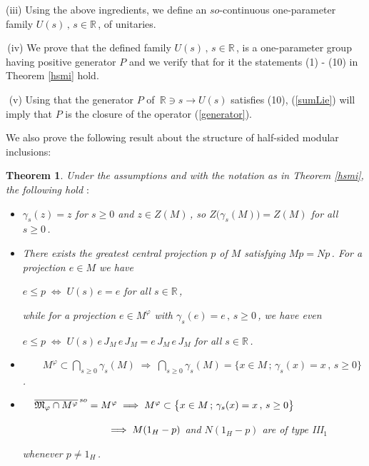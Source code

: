 \documentclass[reqno]{amsart}
\newtheorem{theorem}{Theorem}[section]
\theoremstyle{definition}
\theoremstyle{remark}
\numberwithin{equation}{section}
\theoremstyle{plain}
\begin{document}
(iii) Using the above ingredients, we define an $so$-continuous
one-parameter family $U(s)\, ,\, s\in \mathbb R\,$, of unitaries.

$\,$(iv) We prove that the defined family $U(s)\, ,\, s\in
\mathbb R\,$, is a one-parameter group having positive generator $P$
and we verify that for it the statements (1) - (10) in Theorem
\ref{hsmi} hold.

$\,\,$(v) Using that the generator $P$ of $\,\mathbb R\ni s
\to U(s)$ satisfies (10), (\ref{sumLie}) will imply that $P$ is
the closure of the operator (\ref{generator}).

We also prove
the following result about the structure of half-sided modular
inclusions:
\smallskip

\begin{theorem}\label{type}
Under the assumptions and with the notation as in Theorem \ref{hsmi},
the following hold $:$
\begin{itemize}
\item[(1)] $\gamma_s (z)=z$ for $s\geq 0$ and $z\in Z(M)\,$, so
$Z\big(\gamma_s (M)\big) =Z(M)$ for all $s\geq 0\,$.
\smallskip
\item[(2)] There exists the greatest central projection $p$ of $M$
satisfying $M p =N p\,$. For a projection $e\in M$ we have
\smallskip

\hspace{2 cm}$e\leq p\;\Longleftrightarrow\; U(s)\, e =e$ for all
$s\in\mathbb R\,$,
\smallskip

\noindent while for a projection $e\in M^\varphi$ with $\gamma_s
(e)=e\, ,\, s\geq 0\,$, we have even
\smallskip

\hspace{2 cm}$e\leq p\;\Longleftrightarrow\; U(s)\, e\, J_M\, e\, J_M =
e\, J_M\, e\, J_M$ for all $s\in\mathbb R\,$.
\smallskip
\item[(3)] $\displaystyle \qquad M^\varphi\subset
\bigcap\limits_{s\geq 0} \gamma_s (M)\;\Longrightarrow\;
\bigcap\limits_{s\geq 0}\gamma_s (M) =\big\{ x\in M\, ;\,\gamma_s (x)
= x\, ,\, s\geq 0\big\}\,$.
\smallskip
\item[(4)] $\hspace{3.8 mm}\overline{\mathfrak M_\varphi\cap
M^\varphi}^{\, so}
= M^\varphi\;\Longrightarrow\; M^\varphi\subset
\big\{ x\in M\, ;\,\gamma_s (x)=x\, ,\, s\geq 0\big\}$
\smallskip

$\hspace{3.09 cm}\Longrightarrow\; M (1_H-p)$ and $N (1_H-p)$
are of type \rm{III}$_1$
\smallskip

\hspace{3.75 cm} whenever $p\neq 1_H\,$.
\end{itemize}
\end{theorem}
\smallskip
\end{document}
